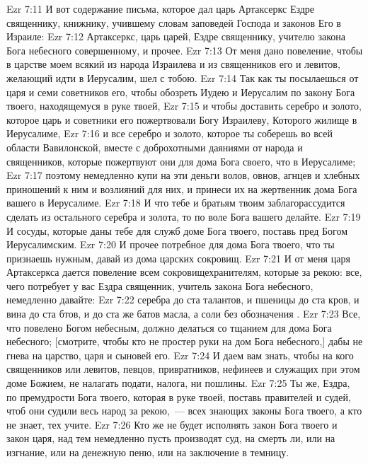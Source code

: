 \rsbpar\vs Ezr 7:11 И вот содержание письма, которое дал царь Артаксеркс Ездре священнику, книжнику, учившему словам заповедей Господа и законов Его в Израиле:
\vs Ezr 7:12 Артаксеркс, царь царей, Ездре священнику, учителю закона Бога небесного совершенному, и прочее.
\vs Ezr 7:13 От меня дано повеление, чтобы в царстве моем всякий из народа Израилева и из священников его и левитов, желающий идти в Иерусалим, шел с тобою.
\vs Ezr 7:14 Так как ты посылаешься от царя и семи советников его, чтобы обозреть Иудею и Иерусалим по закону Бога твоего, находящемуся в руке твоей,
\vs Ezr 7:15 и чтобы доставить серебро и золото, которое царь и советники его пожертвовали Богу Израилеву, Которого жилище в Иерусалиме,
\vs Ezr 7:16 и все серебро и золото, которое ты соберешь во всей области Вавилонской, вместе с доброхотными даяниями от народа и священников, которые пожертвуют они для дома Бога своего, что в Иерусалиме;
\vs Ezr 7:17 поэтому немедленно купи на эти деньги волов, овнов, агнцев и хлебных приношений к ним и возлияний для них, и принеси их на жертвенник дома Бога вашего в Иерусалиме.
\vs Ezr 7:18 И что тебе и братьям твоим заблагорассудится сделать из остального серебра и золота, то по воле Бога вашего делайте.
\vs Ezr 7:19 И сосуды, которые даны тебе для служб  доме Бога твоего, поставь пред Богом Иерусалимским.
\vs Ezr 7:20 И прочее потребное для дома Бога твоего, что ты признаешь нужным, давай из дома царских сокровищ.
\vs Ezr 7:21 И от меня царя Артаксеркса дается повеление всем сокровищехранителям, которые за рекою: все, чего потребует у вас Ездра священник, учитель закона Бога небесного, немедленно давайте:
\vs Ezr 7:22 серебра до ста талантов, и пшеницы до ста кров, и вина до ста бтов, и до ста же батов масла, а соли без обозначения .
\vs Ezr 7:23 Все, что повелено Богом небесным, должно делаться со тщанием для дома Бога небесного; [смотрите, чтобы кто не простер руки на дом Бога небесного,] дабы не  гнева  на царство, царя и сыновей его.
\vs Ezr 7:24 И даем вам знать, чтобы  на кого  священников или левитов, певцов, привратников, нефинеев и служащих при этом доме Божием, не налагать  подати,  налога, ни пошлины.
\vs Ezr 7:25 Ты же, Ездра, по премудрости Бога твоего, которая в руке твоей, поставь правителей и судей, чтоб они судили весь народ за рекою,~--- всех знающих законы Бога твоего, а кто не знает, тех учите.
\vs Ezr 7:26 Кто же не будет исполнять закон Бога твоего и закон царя, над тем немедленно пусть производят суд, на смерть ли, или на изгнание, или на денежную пеню, или на заключение в темницу.
